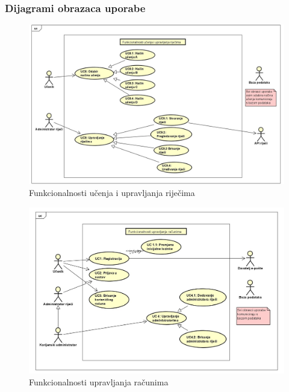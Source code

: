 \eject


\subsubsection{Dijagrami obrazaca uporabe}

\begin{figure}[H]
	\includegraphics[scale=0.30]{dijagrami/dijagram1.jpg} 
	\centering
	\caption{Funkcionalnosti učenja i upravljanja riječima}
	\label{fig:dijagram1}
\end{figure}

\begin{figure}[H]
	\includegraphics[scale=0.35]{dijagrami/dijagram2.jpg} 
	\centering
	\caption{Funkcionalnosti upravljanja računima}
	\label{fig:dijagram2}
\end{figure}


